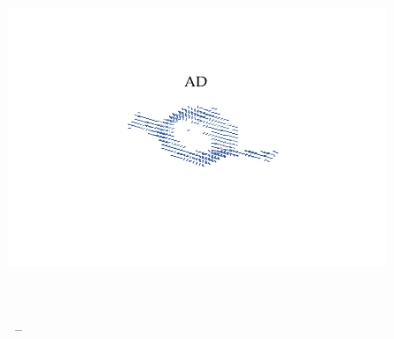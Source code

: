 
\begin{titlepage}

    \begin{addmargin}[-1cm]{-3cm}
        \begin{center}
            \large

            \hfill
            \vfill

            \begingroup
            \color{Maroon}\spacedallcaps{\myTitle} \\ \bigskip %
            \endgroup

            \spacedlowsmallcaps{\myName} %

            \vfill

            \includegraphics[trim={3.5cm 3.5cm 3.5cm 3.5cm},clip, width=10cm]{./svg-inkscape/ck_indAD_svg-tex.pdf} \\ \medskip %

            \mySubtitle \\ \medskip %

            \myTime\ -- \myVersion %

            \vfill

        \end{center}
    \end{addmargin}

\end{titlepage}